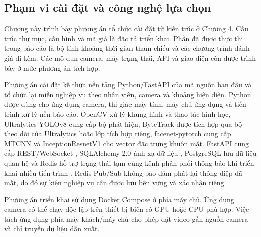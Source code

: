 \setcounter{section}{5}
\setcounter{subsection}{0}
\setcounter{subsubsection}{0}

\subsection{Phạm vi cài đặt và công nghệ lựa chọn}
Chương này trình bày phương án tổ chức cài đặt từ kiến trúc ở Chương 4. Cấu trúc thư mục, cấu hình và mã giả là đặc tả triển khai. Phần đã được thực thi trong báo cáo là bộ tính khoảng thời gian tham chiếu và các chương trình đánh giá đi kèm. Các mô-đun camera, máy trạng thái, API và giao diện còn được trình bày ở mức phương án tích hợp.

Phương án cài đặt kế thừa nền tảng Python/FastAPI của mã nguồn ban đầu và tổ chức lại miền nghiệp vụ theo nhân viên, camera và khoảng hiện diện. Python được dùng cho ứng dụng camera, thị giác máy tính, máy chủ ứng dụng và tiến trình xử lý nền báo cáo. OpenCV xử lý khung hình và thao tác hình học, Ultralytics YOLOv8 cung cấp bộ phát hiện, ByteTrack được tích hợp qua bộ theo dõi của Ultralytics hoặc lớp tích hợp riêng, facenet-pytorch cung cấp MTCNN và InceptionResnetV1 cho vector đặc trưng khuôn mặt. FastAPI cung cấp REST/WebSocket \cite{fastapi}, SQLAlchemy 2.0 ánh xạ dữ liệu \cite{sqlalchemy}, PostgreSQL lưu dữ liệu quan hệ \cite{postgresql} và Redis hỗ trợ trạng thái tạm cùng kênh phân phối thông báo khi triển khai nhiều tiến trình \cite{redis}. Redis Pub/Sub không bảo đảm phát lại thông điệp đã mất, do đó sự kiện nghiệp vụ cần được lưu bền vững và xác nhận riêng.

Phương án triển khai sử dụng Docker Compose ở phía máy chủ. Ứng dụng camera có thể chạy độc lập trên thiết bị biên có GPU hoặc CPU phù hợp. Việc tách ứng dụng phía máy khách/máy chủ cho phép đặt video gần nguồn camera và chỉ truyền dữ liệu dẫn xuất.

